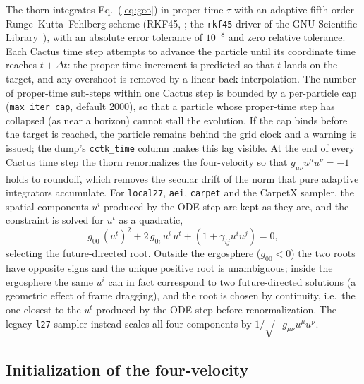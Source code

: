 \documentclass[11pt]{article}
\begin{document}
The thorn integrates Eq.~(\ref{eq:geo}) in proper time $\tau$ with an
adaptive fifth-order Runge--Kutta--Fehlberg scheme (RKF45,
\citealt{fehlberg1969}; the \texttt{rkf45} driver of the GNU Scientific
Library~\citep{gsl}), with an absolute error tolerance of $10^{-8}$ and
zero relative tolerance.  Each Cactus time step attempts to advance the
particle until its coordinate time reaches $t + \Delta t$: the proper-time
increment is predicted so that $t$ lands on the target, and any overshoot is
removed by a linear back-interpolation.  The number of proper-time sub-steps
within one Cactus step is bounded by a per-particle cap
(\texttt{max\_iter\_cap}, default 2000), so that a particle whose proper-time
step has collapsed (as near a horizon) cannot stall the evolution.  If the cap
binds before the target is reached, the particle remains behind the grid clock
and a warning is issued; the dump's \texttt{cctk\_time} column makes this lag
visible.  At the end of every Cactus time step the thorn renormalizes the
four-velocity so that $g_{\mu\nu}u^\mu u^\nu = -1$ holds to roundoff,
which removes the secular drift of the norm that pure adaptive integrators
accumulate.  For \texttt{local27}, \texttt{aei}, \texttt{carpet} and the
CarpetX sampler, the spatial components $u^i$ produced by the ODE step are
kept as they are, and the constraint is solved for $u^t$ as a quadratic,
\begin{equation}
g_{00}\,(u^t)^2 + 2\,g_{0i}\,u^i\,u^t + \left(1 + \gamma_{ij}u^i u^j\right) = 0,
\label{eq:renorm}
\end{equation}
selecting the future-directed root.  Outside the ergosphere
($g_{00}<0$) the two roots have opposite signs and the unique positive
root is unambiguous; inside the ergosphere the same $u^i$ can
in fact correspond to two future-directed solutions (a geometric effect
of frame dragging), and the root is chosen by continuity, i.e.\ the one
closest to the $u^t$ produced by the ODE step before renormalization.
The legacy \texttt{l27} sampler instead scales all four components by
$1/\sqrt{-g_{\mu\nu}u^\mu u^\nu}$.

\subsection{Initialization of the four-velocity}
\end{document}
